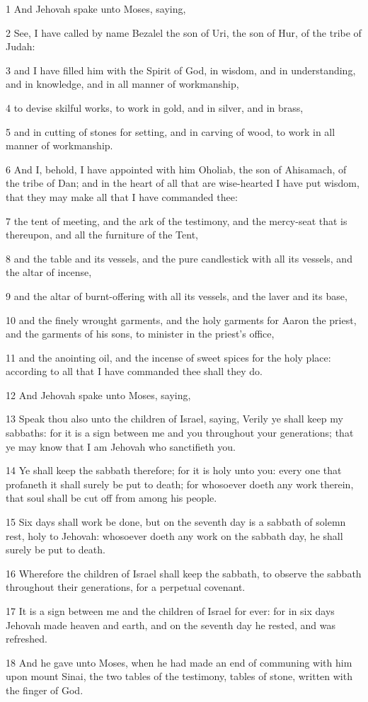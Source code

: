 \par 1 And Jehovah spake unto Moses, saying,
\par 2 See, I have called by name Bezalel the son of Uri, the son of Hur, of the tribe of Judah:
\par 3 and I have filled him with the Spirit of God, in wisdom, and in understanding, and in knowledge, and in all manner of workmanship,
\par 4 to devise skilful works, to work in gold, and in silver, and in brass,
\par 5 and in cutting of stones for setting, and in carving of wood, to work in all manner of workmanship.
\par 6 And I, behold, I have appointed with him Oholiab, the son of Ahisamach, of the tribe of Dan; and in the heart of all that are wise-hearted I have put wisdom, that they may make all that I have commanded thee:
\par 7 the tent of meeting, and the ark of the testimony, and the mercy-seat that is thereupon, and all the furniture of the Tent,
\par 8 and the table and its vessels, and the pure candlestick with all its vessels, and the altar of incense,
\par 9 and the altar of burnt-offering with all its vessels, and the laver and its base,
\par 10 and the finely wrought garments, and the holy garments for Aaron the priest, and the garments of his sons, to minister in the priest's office,
\par 11 and the anointing oil, and the incense of sweet spices for the holy place: according to all that I have commanded thee shall they do.
\par 12 And Jehovah spake unto Moses, saying,
\par 13 Speak thou also unto the children of Israel, saying, Verily ye shall keep my sabbaths: for it is a sign between me and you throughout your generations; that ye may know that I am Jehovah who sanctifieth you.
\par 14 Ye shall keep the sabbath therefore; for it is holy unto you: every one that profaneth it shall surely be put to death; for whosoever doeth any work therein, that soul shall be cut off from among his people.
\par 15 Six days shall work be done, but on the seventh day is a sabbath of solemn rest, holy to Jehovah: whosoever doeth any work on the sabbath day, he shall surely be put to death.
\par 16 Wherefore the children of Israel shall keep the sabbath, to observe the sabbath throughout their generations, for a perpetual covenant.
\par 17 It is a sign between me and the children of Israel for ever: for in six days Jehovah made heaven and earth, and on the seventh day he rested, and was refreshed.
\par 18 And he gave unto Moses, when he had made an end of communing with him upon mount Sinai, the two tables of the testimony, tables of stone, written with the finger of God.

